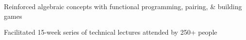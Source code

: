 \documentclass[letterpaper]{deedy-resume} %
\begin{document}
\begin{minipage}[t]{0.66\textwidth}


\begin{tightitemize}
\item Reinforced algebraic concepts with functional programming, pairing, \& building games
\end{tightitemize}

\sectionspace %



\begin{tightitemize}
\item Facilitated 15-week series of technical lectures attended by 250+ people
\end{tightitemize}

\sectionspace %

%
%
%
%

%
%

\end{minipage} %
\end{document}
